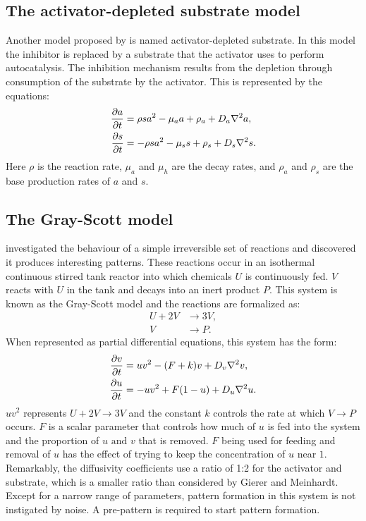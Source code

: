 \subsection{The activator-depleted substrate model}
Another model proposed by \citet{gierer1972} is named activator-depleted substrate. In this model the inhibitor is replaced by a substrate that the activator uses to perform autocatalysis. The inhibition mechanism results from the depletion through consumption of the substrate by the activator. This is represented by the equations:
	\begin{equation}
	\begin{aligned} \label{eq:activatorSubstrateRD}
		\frac{\partial a}{\partial t} &= \rho sa^2 - \mu_a a + \rho_a + D_a \nabla^2 a,\\
		\frac{\partial s}{\partial t} &= -\rho sa^2 - \mu_s s + \rho_s + D_s \nabla^2 s.
	\end{aligned}
	\end{equation}
Here $\rho$ is the reaction rate, $\mu_a$ and $\mu_h$ are the decay rates, and $\rho_a$ and $\rho_s$ are the base production rates of $a$ and $s$.

\subsection{The Gray-Scott model}
\citet{gray1984} investigated the behaviour of a simple irreversible set of reactions and discovered it produces interesting patterns. These reactions occur in an isothermal continuous stirred tank reactor into which chemicals $U$ is continuously fed. $V$ reacts with $U$ in the tank and decays into an inert product $P$. This system is known as the Gray-Scott model and the reactions are formalized as:
	\begin{equation}
	\begin{aligned}
		U + 2V &\to 3V, \\
		V &\to P.
	\end{aligned}
	\end{equation}
When represented as partial differential equations, this system has the form:
	\begin{equation}
	\begin{aligned} \label{eq:grayscottRD}
		\frac{\partial v}{\partial t} &= uv^2 - (F+k)v + D_v \nabla^2 v,\\
		\frac{\partial u}{\partial t} &= -uv^2 + F(1-u) + D_u \nabla^2 u.
	\end{aligned}
	\end{equation}
$uv^2$ represents $U + 2V \to 3V$ and the constant $k$ controls the rate at which $V \to P$ occurs. $F$ is a scalar parameter that controls how much of $u$ is fed into the system and the proportion of $u \text{ and } v$ that is removed. $F$ being used for feeding and removal of $u$ has the effect of trying to keep the concentration of $u$ near $1$. Remarkably, the diffusivity coefficients use a ratio of 1:2 for the activator and substrate, which is a smaller ratio than considered by Gierer and Meinhardt. Except for a narrow range of parameters, pattern formation in this system is not instigated by noise. A pre-pattern is required to start pattern formation. 

